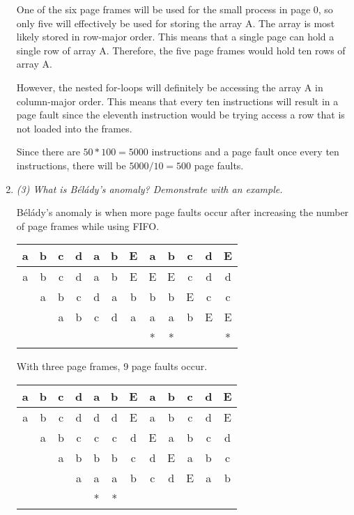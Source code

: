 \documentclass[letterpaper,11pt]{article}
\begin{document}
\begin{enumerate}
One of the six page frames will be used for the small process in page 0, so only five will effectively be used for storing the array A.  The array is most likely stored in row-major order.  This means that a single page can hold a single row of array A.  Therefore, the five page frames would hold ten rows of array A.

However, the nested for-loops will definitely be accessing the array A in column-major order.  This means that every ten instructions will result in a page fault since the eleventh instruction would be trying access a row that is not loaded into the frames.

Since there are $50 * 100 = 5000$ instructions and a page fault once every ten instructions, there will be $5000 / 10 = 500$ page faults.

\item  \emph{(3) What is B\'{e}l\'{a}dy's anomaly? Demonstrate with an example.}

B\'{e}l\'{a}dy's anomaly is when more page faults occur after increasing the number of page frames while using FIFO.

\begin{center}
  \begin{tabular}{ | c | c | c | c | c | c | c | c | c | c | c | c | }
  \hline
                     a & b & c & d & a & b & E & a & b & c & d & E \\ \hline 
                     a & b & c & d & a & b & E & E & E & c & d & d \\
                       & a & b & c & d & a & b & b & b & E & c & c \\
                       &   & a & b & c & d & a & a & a & b & E & E \\ \hline
                       &   &   &   &   &   &   & * & * &   &   & * \\ \hline
  \end{tabular}
\end{center}

With three page frames, 9 page faults occur.
\begin{center}
  \begin{tabular}{ | c | c | c | c | c | c | c | c | c | c | c | c | }
  \hline
                     a & b & c & d & a & b & E & a & b & c & d & E \\ \hline 
                     a & b & c & d & d & d & E & a & b & c & d & E \\
                       & a & b & c & c & c & d & E & a & b & c & d \\
                       &   & a & b & b & b & c & d & E & a & b & c \\ 
                       &   &   & a & a & a & b & c & d & E & a & b \\ \hline
                       &   &   &   & * & * &   &   &   &   &   &   \\ \hline
  \end{tabular}
\end{center}


\end{enumerate}
\end{document}
